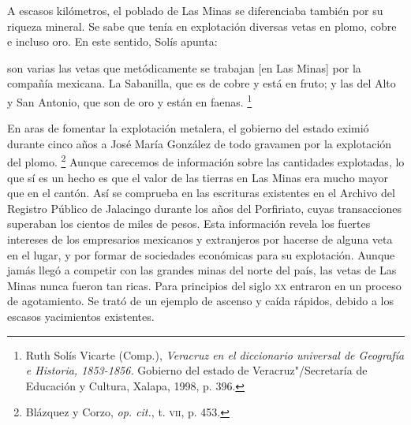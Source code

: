 \documentclass[14pt,twoside,final]{extbook} %
\let\oldfootnote\footnote
\renewcommand\footnote[1]{%
\oldfootnote{\hspace{1mm}#1}}
\begin{document}
A escasos kilómetros, el poblado de Las Minas se diferenciaba también por su riqueza mineral. Se sabe que tenía en explotación diversas vetas en plomo, cobre e incluso oro. En este sentido, Solís apunta:
\begin{quoting}
son varias las vetas que metódicamente se trabajan [en Las Minas] por la compañía mexicana. La Sabanilla, que es de cobre y está en fruto; y las del Alto y San Antonio, que son de oro y están en faenas.\footnote{Ruth Solís Vicarte (Comp.), \emph{Veracruz en el diccionario universal de Geografía e Historia, 1853-1856.} Gobierno del estado de Veracruz"/Secretaría de Educación y Cultura, Xalapa, 1998, p. 396.}
\end{quoting}
En aras de fomentar la explotación metalera, el gobierno del estado eximió durante cinco años a José María González de todo gravamen por la explotación del plomo.\footnote{Blázquez y Corzo, \emph{op. cit.}, t. \textsc{vii}, p. 453.} Aunque carecemos de información sobre las cantidades explotadas, lo que sí es un hecho es que el valor de las tierras en Las Minas era mucho mayor que en el cantón. Así se comprueba en las escrituras existentes en el Archivo del Registro Público de Jalacingo durante los años del Porfiriato, cuyas transacciones superaban los cientos de miles de pesos. Esta información revela los fuertes intereses de los empresarios mexicanos y extranjeros por hacerse de alguna veta en el lugar, y por formar de sociedades económicas para su explotación. Aunque jamás llegó a competir con las grandes minas del norte del país, las vetas de Las Minas nunca fueron tan ricas. Para principios del siglo \textsc{xx} entraron en un proceso de agotamiento. Se trató de un ejemplo de ascenso y caída rápidos, debido a los escasos yacimientos existentes.
\end{document}
